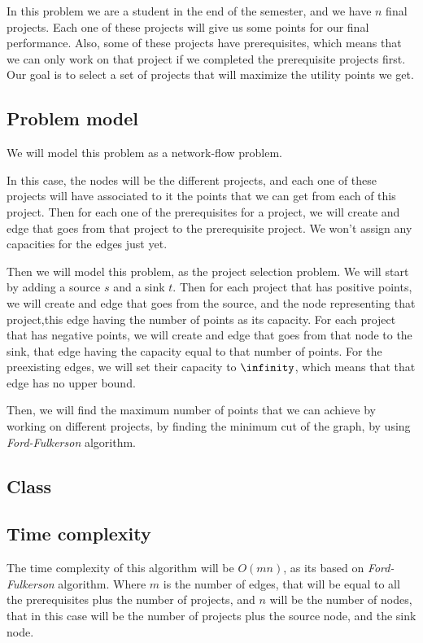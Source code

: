 \documentclass{article}
\begin{document}
In this problem we are a student in the end of the semester, and we have $n$ final projects. Each one of these projects will give us some points for our final performance. Also, some of these projects have prerequisites, which means that we can only work on that project if we completed the prerequisite projects first. Our goal is to select a set of projects that will maximize the utility points we get.

\subsection*{Problem model}

We will model this problem as a network-flow problem.

In this case, the nodes will be the different projects, and each one of these projects will have associated to it the points that we can get from each of this project. Then for each one of the prerequisites for a project, we will create and edge that goes from that project to the prerequisite project. We won't assign any capacities for the edges just yet.

Then we will model this problem, as the project selection problem. We will start by adding a source $s$ and a sink $t$. Then for each project that has positive points, we will create and edge that goes from the source, and the node representing that project,this edge having the number of points as its capacity. For each project that has negative points, we will create and edge that goes from that node to the sink, that edge having the capacity equal to that number of points. For the preexisting edges, we will set their capacity to $\infinity$, which means that that edge has no upper bound.

Then, we will find the maximum number of points that we can achieve by working on different projects, by finding the minimum cut of the graph, by using \textit{Ford-Fulkerson} algorithm.

\subsection*{Class}

\subsection*{Time complexity}

The time complexity of this algorithm will be $O(mn)$, as its based on \textit{Ford-Fulkerson} algorithm. Where $m$ is the number of edges, that will be equal to all the prerequisites plus the number of projects, and $n$ will be the number of nodes, that in this case will be the number of projects plus the source node, and the sink node.
\end{document}
